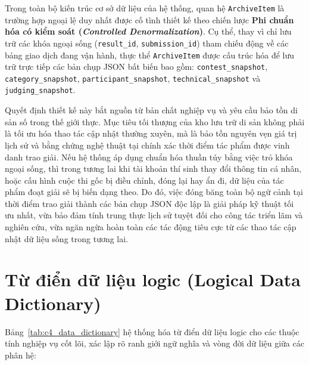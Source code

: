 Trong toàn bộ kiến trúc cơ sở dữ liệu của hệ thống, quan hệ \texttt{ArchiveItem} là trường hợp ngoại lệ duy nhất được cố tình thiết kế theo chiến lược \textbf{Phi chuẩn hóa có kiểm soát (\textit{Controlled Denormalization})}. Cụ thể, thay vì chỉ lưu trữ các khóa ngoại sống (\texttt{result\_id}, \texttt{submission\_id}) tham chiếu động về các bảng giao dịch đang vận hành, thực thể \texttt{ArchiveItem} được cấu trúc hóa để lưu trữ trực tiếp các bản chụp JSON bất biến bao gồm: \texttt{contest\_snapshot}, \texttt{category\_snapshot}, \texttt{participant\_snapshot}, \texttt{technical\_snapshot} và \texttt{judging\_snapshot}.

Quyết định thiết kế này bắt nguồn từ bản chất nghiệp vụ và yêu cầu bảo tồn di sản số trong thế giới thực. Mục tiêu tối thượng của kho lưu trữ di sản không phải là tối ưu hóa thao tác cập nhật thường xuyên, mà là bảo tồn nguyên vẹn giá trị lịch sử và bằng chứng nghệ thuật tại chính xác thời điểm tác phẩm được vinh danh trao giải. Nếu hệ thống áp dụng chuẩn hóa thuần túy bằng việc trỏ khóa ngoại sống, thì trong tương lai khi tài khoản thí sinh thay đổi thông tin cá nhân, hoặc cấu hình cuộc thi gốc bị điều chỉnh, đóng lại hay ẩn đi, dữ liệu của tác phẩm đoạt giải sẽ bị biến dạng theo. Do đó, việc đóng băng toàn bộ ngữ cảnh tại thời điểm trao giải thành các bản chụp JSON độc lập là giải pháp kỹ thuật tối ưu nhất, vừa bảo đảm tính trung thực lịch sử tuyệt đối cho công tác triển lãm và nghiên cứu, vừa ngăn ngừa hoàn toàn các tác động tiêu cực từ các thao tác cập nhật dữ liệu sống trong tương lai.

\section{Từ điển dữ liệu logic (Logical Data Dictionary)}
\label{s:c4_data_dictionary}

Bảng~\ref{tab:c4_data_dictionary} hệ thống hóa từ điển dữ liệu logic cho các thuộc tính nghiệp vụ cốt lõi, xác lập rõ ranh giới ngữ nghĩa và vòng đời dữ liệu giữa các phân hệ:

